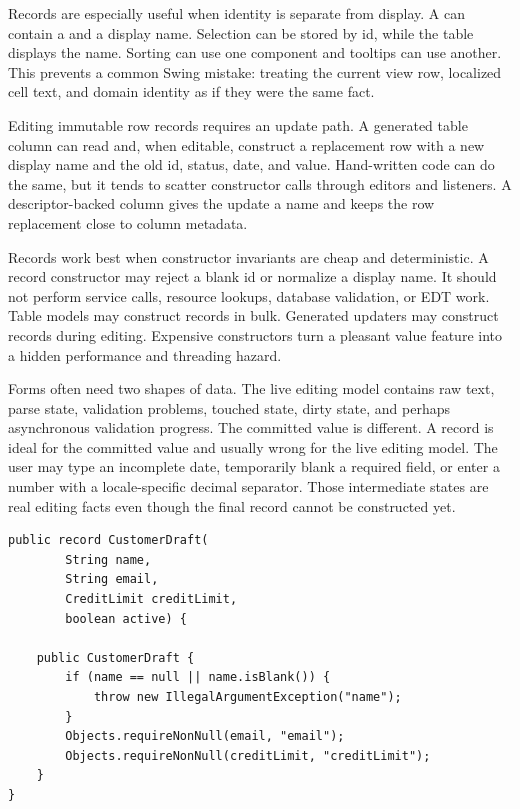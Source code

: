 Records are especially useful when identity is separate from display. A  can contain a  and a display name. Selection can be stored by id, while the table displays the name. Sorting can use one component and tooltips can use another. This prevents a common Swing mistake: treating the current view row, localized cell text, and domain identity as if they were the same fact.

Editing immutable row records requires an update path. A generated table column can read  and, when editable, construct a replacement row with a new display name and the old id, status, date, and value. Hand-written code can do the same, but it tends to scatter constructor calls through editors and listeners. A descriptor-backed column gives the update a name and keeps the row replacement close to column metadata.

Records work best when constructor invariants are cheap and deterministic. A record constructor may reject a blank id or normalize a display name. It should not perform service calls, resource lookups, database validation, or EDT work. Table models may construct records in bulk. Generated updaters may construct records during editing. Expensive constructors turn a pleasant value feature into a hidden performance and threading hazard.

Forms often need two shapes of data. The live editing model contains raw text, parse state, validation problems, touched state, dirty state, and perhaps asynchronous validation progress. The committed value is different. A record is ideal for the committed value and usually wrong for the live editing model. The user may type an incomplete date, temporarily blank a required field, or enter a number with a locale-specific decimal separator. Those intermediate states are real editing facts even though the final record cannot be constructed yet.

\begin{lstlisting}[caption={A committed form value, not the live text-field state.}]
public record CustomerDraft(
        String name,
        String email,
        CreditLimit creditLimit,
        boolean active) {

    public CustomerDraft {
        if (name == null || name.isBlank()) {
            throw new IllegalArgumentException("name");
        }
        Objects.requireNonNull(email, "email");
        Objects.requireNonNull(creditLimit, "creditLimit");
    }
}
\end{lstlisting}

